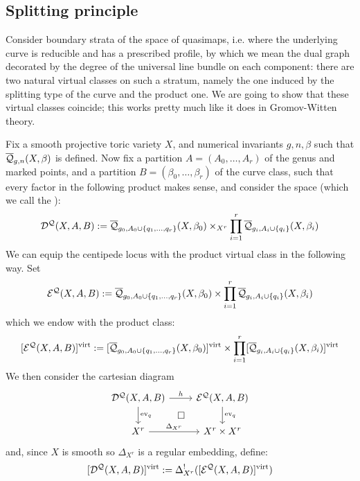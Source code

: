 \subsection{Splitting principle} \label{Subsection splitting}

Consider boundary strata of the space of quasimaps, i.e. where the underlying curve is reducible and has a prescribed profile, by which we mean the dual graph decorated by the degree of the universal line bundle on each component: there are two natural virtual classes on such a stratum, namely the one induced by the splitting type of the curve and the product one. We are going to show that these virtual classes coincide; this works pretty much like it does in Gromov-Witten theory.

Fix a smooth projective toric variety $X$, and numerical invariants $g,n,\beta$ such that $\overline{\mathcal Q}_{g,n}(X,\beta)$ is defined. Now fix a partition $A=(A_0,\ldots,A_r)$ of the genus and marked points, and a partition $B=(\beta_0, \ldots, \beta_r)$ of the curve class, such that every factor in the following product makes sense, and consider the space (which we call the ):
\begin{equation*} \mathcal{D^Q}(X,A,B) := \overline{\mathcal Q}_{g_0,A_0 \cup \{ q_1, \ldots, q_r \}}(X,\beta_0) \times_{X^r} \prod_{i=1}^r \overline{\mathcal Q}_{g_i,A_i\cup\{q_i\}}(X,\beta_i) \end{equation*}
We can equip the centipede locus with the product virtual class in the following way. Set
\begin{equation*} \mathcal{E^Q}(X,A,B) :=  \overline{\mathcal Q}_{g_0,A_0 \cup \{ q_1, \ldots, q_r \}}(X,\beta_0) \times \prod_{i=1}^r \overline{\mathcal Q}_{g_i,A_i\cup\{q_i\}}(X,\beta_i) \end{equation*}
which we endow with the product class:
\begin{equation*} [\mathcal{E^Q}(X,A,B)]^{\operatorname{virt}} := [\overline{\mathcal Q}_{g_0,A_0 \cup \{ q_1, \ldots, q_r \}}(X,\beta_0)]^{\operatorname{virt}} \times \prod_{i=1}^r [\overline{\mathcal Q}_{g_i,A_i\cup\{q_i\}}(X,\beta_i)]^{\operatorname{virt}} \end{equation*}
We then consider the cartesian diagram
\begin{equation} \label{Product diagram}
\begin{tikzcd}
\D{X}{A}{B} \ar[r,"h"] \ar[d,"\ev_q"] \ar[rd,phantom,"\square"] & \E{X}{A}{B} \ar[d,"\ev_q"] \\
X^r \ar[r,"\Delta_{X^r}"] & X^r \times X^r
\end{tikzcd}
\end{equation}
and, since $X$ is smooth so $\Delta_{X^r}$ is a regular embedding, define:
\begin{equation*} [\mathcal{D^Q}(X,A,B)]^{\operatorname{virt}} := \Delta_{X^r}^! ([\mathcal{E^Q}(X,A,B)]^{\operatorname{virt}}) \end{equation*}
